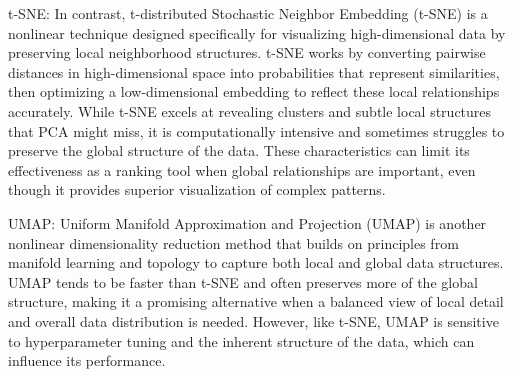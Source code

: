 t-SNE: In contrast, t-distributed Stochastic Neighbor Embedding (t-SNE) is a nonlinear technique designed specifically for visualizing high-dimensional data by preserving local neighborhood structures. t-SNE works by converting pairwise distances in high-dimensional space into probabilities that represent similarities, then optimizing a low-dimensional embedding to reflect these local relationships accurately. While t-SNE excels at revealing clusters and subtle local structures that PCA might miss, it is computationally intensive and sometimes struggles to preserve the global structure of the data. These characteristics can limit its effectiveness as a ranking tool when global relationships are important, even though it provides superior visualization of complex patterns.

UMAP: Uniform Manifold Approximation and Projection (UMAP) is another nonlinear dimensionality reduction method that builds on principles from manifold learning and topology to capture both local and global data structures. UMAP tends to be faster than t-SNE and often preserves more of the global structure, making it a promising alternative when a balanced view of local detail and overall data distribution is needed. However, like t-SNE, UMAP is sensitive to hyperparameter tuning and the inherent structure of the data, which can influence its performance.

